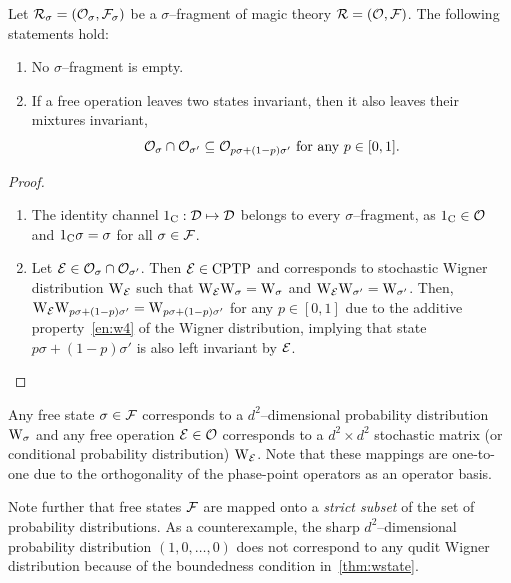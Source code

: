 \begin{proposition}\label{thm:frag_app}
    Let $\mathcal{R}_\sigma = (\mathcal{O}_\sigma, \mathcal{F}_\sigma)$ be a $\sigma$--fragment of magic theory $\mathcal{R} = (\mathcal{O}, \mathcal{F})$. 
    The following statements hold:
    \begin{enumerate}
        \item No $\sigma$--fragment is empty.
        \item If a free operation leaves two states invariant, then it also leaves their mixtures invariant, 
        \begin{equation*}
            \mathcal{O}_{\sigma} \cap \mathcal{O}_{\sigma'} \subseteq \mathcal{O}_{p\sigma + (1-p)\sigma'}\ \text{for any}\ p \in [0,1].
        \end{equation*}
    \end{enumerate}
\end{proposition}
\begin{proof}$ $\vspace{-12pt}\\

\begin{enumerate}
    \item The identity channel $1_{\rm{C}}: \mathcal{D} \mapsto \mathcal{D}$ belongs to every $\sigma$--fragment, as $1_{\rm{C}} \in \mathcal{O}$ and $1_{\rm{C}}\sigma = \sigma$ for all $\sigma \in \mathcal{F}$.
    
    \item Let $\mathcal{E} \in \mathcal{O}_{\sigma} \cap \mathcal{O}_{\sigma'}$.
    Then $\mathcal{E} \in {\rm{CPTP}}$ and corresponds to stochastic Wigner distribution $\W{\E}$ such that $\W{\E} \W{\sigma} = \W{\sigma}$ and $\W{\E} \W{\sigma'} = \W{\sigma'}$.
    Then, $\W{\E} \W{p\sigma + (1-p)\sigma'} = \W{p\sigma + (1-p)\sigma'}$ for any $p \in [0,1]$ due to the additive property~\ref{en:w4} of the Wigner distribution, implying that state $p\sigma + (1-p)\sigma'$ is also left invariant by $\mathcal{E}$.
\end{enumerate}
\vspace{-20pt}
\end{proof}

Any free state $\sigma \in \mathcal{F}$ corresponds to a $d^2$--dimensional probability distribution $\W{\sigma}$ and any free operation $\mathcal{E} \in \mathcal{O}$ corresponds to a $d^2 \times d^2$ stochastic matrix (or conditional probability distribution) $\W{\E}$.
Note that these mappings are one-to-one due to the orthogonality of the phase-point operators as an operator basis.

Note further that free states $\mathcal{F}$ are mapped onto a \emph{strict subset} of the set of probability distributions.
As a counterexample, the sharp $d^2$--dimensional probability distribution $(1, 0, \dots, 0)$ does not correspond to any qudit Wigner distribution because of the boundedness condition in~\cref{thm:wstate}.

